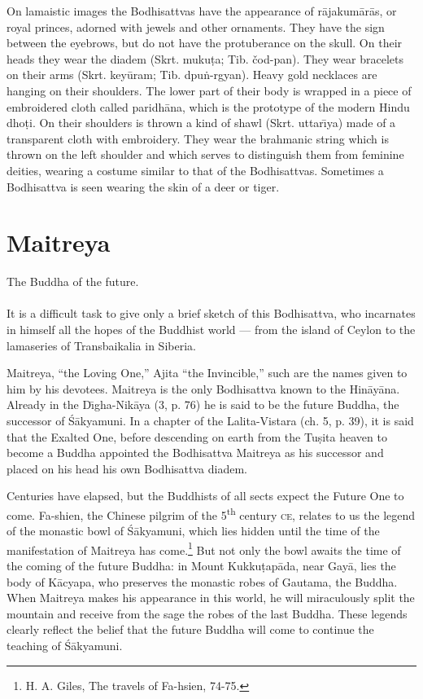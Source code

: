 \documentclass[a4paper, 12pt, oneside]{article}
\begin{document}
On lamaistic images the Bodhisattvas have the appearance of r\={a}jakum\={a}r\={a}s, or royal princes, adorned with jewels and other ornaments. They have the sign between the eyebrows, but do not have the protuberance on the skull. On their heads they wear the diadem (Skrt. muku\d{t}a; Tib. čod-pan). They wear bracelets on their arms (Skrt. key\={u}ram; Tib. dpu\.{n}-rgyan). Heavy gold necklaces are hanging on their shoulders. The lower part of their body is wrapped in a piece of embroidered cloth called paridh\={a}na, which is the prototype of the modern Hindu dho\d{t}i. On their shoulders is thrown a kind of shawl (Skrt. uttar\={\i}ya) made of a transparent cloth with embroidery. They wear the brahmanic string which is thrown on the left shoulder and which serves to distinguish them from feminine deities, wearing a costume similar to that of the Bodhisattvas. Sometimes a Bodhisattva is seen wearing the skin of a deer or tiger.

\clearpage
\section{Maitreya}
\begin{center}
The Buddha of the future.
\end{center}
\paragraph{}
It is a difficult task to give only a brief sketch of this Bodhisattva, who incarnates in himself all the hopes of the Buddhist world --- from the island of Ceylon to the lamaseries of Transbaikalia in Siberia.

Maitreya, ``the Loving One,'' Ajita ``the Invincible,'' such are the names given to him by his devotees. Maitreya is the only Bodhisattva known to the Hin\={a}y\={a}na. Already in the D\={\i}gha-Nik\={a}ya (3, p. 76) he is said to be the future Buddha, the successor of \'{S}\={a}kyamuni. In a chapter of the Lalita-Vistara (ch. 5, p. 39), it is said that the Exalted One, before descending on earth from the Tu\d{s}ita heaven to become a Buddha appointed the Bodhisattva Maitreya as his successor and placed on his head his own Bodhisattva diadem.

Centuries have elapsed, but the Buddhists of all sects expect the Future One to come. Fa-shien, the Chinese pilgrim of the 5\textsuperscript{th} century \textsc{ce}, relates to us the legend of the monastic bowl of \'{S}\={a}kyamuni, which lies hidden until the time of the manifestation of Maitreya has come.\footnote{H. A. Giles, The travels of Fa-hsien, 74-75.} But not only the bowl awaits the time of the coming of the future Buddha: in Mount Kukku\d{t}ap\={a}da, near Gay\={a}, lies the body of K\={a}cyapa, who preserves the monastic robes of Gautama, the Buddha. When Maitreya makes his appearance in this world, he will miraculously split the mountain and receive from the sage the robes of the last Buddha. These legends clearly reflect the belief that the future Buddha will come to continue the teaching of \'{S}\={a}kyamuni.
\end{document}
